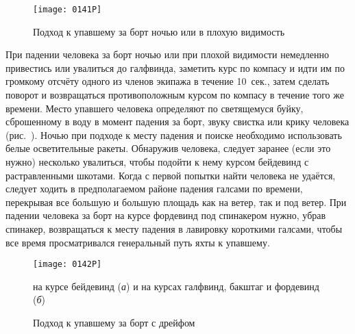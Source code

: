 \begin{figure}[!htb]
  \centering{}
  \texttt{[image: 0141P]}
  \caption{Подход к упавшему за борт ночью или в плохую видимость}
  \label{fig:141}
\end{figure}

При падении человека за борт ночью или при плохой видимости немедленно
привестись или увалиться до галфвинда, заметить курс по компасу и идти
им по громкому отсчёту одного из членов экипажа в течение 10~сек., затем сделать поворот и возвращаться противоположным курсом
по компасу в течение того же времени. Место упавшего человека
определяют по светящемуся буйку, сброшенному в воду в момент падения
за борт, звуку свистка или крику человека (рис.~). Ночью при
подходе к месту падения и поиске необходимо использовать белые
осветительные ракеты. Обнаружив человека, следует заранее (если это
нужно) несколько увалиться, чтобы подойти к нему курсом бейдевинд с
растравленными шкотами. Когда с первой попытки найти человека не
удаётся, следует ходить в предполагаемом районе падения галсами по
времени, перекрывая все большую и большую площадь как на ветер, так и
под ветер. При падении человека за борт на курсе фордевинд под
спинакером нужно, убрав спинакер, возвращаться к месту падения в
лавировку короткими галсами, чтобы все время просматривался
генеральный путь яхты к упавшему.

\begin{figure*}[!htb]
  \centering{}
  \texttt{[image: 0142P]}
  \caption{Подход к упавшему за борт с дрейфом}
  \label{fig:142}
  \small
  \centering{}
  на курсе бейдевинд (\textit{а}) и на курсах галфвинд, бакштаг и фордевинд (\textit{б})
\end{figure*}

